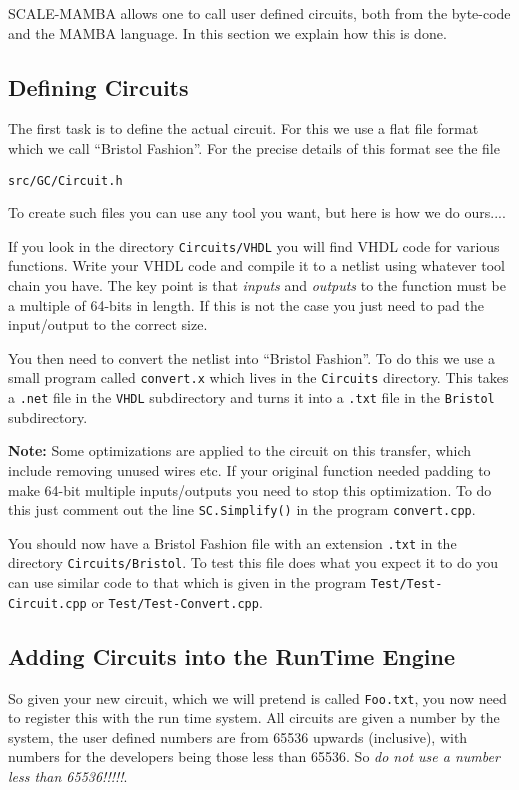 \label{sec:GC}
SCALE-MAMBA allows one to call user defined circuits, both
from the byte-code and the MAMBA language.
In this section we explain how this is done.

\subsection{Defining Circuits}
The first task is to define the actual circuit.
For this we use a flat file format which we call 
``Bristol Fashion''.
For the precise details of this format see the
file 
\begin{center}
\verb|src/GC/Circuit.h|
\end{center}
To create such files you can use any tool you want,
but here is how we do ours....

If you look in the directory \verb|Circuits/VHDL| you
will find VHDL code for various functions. Write your
VHDL code and compile it to a netlist using whatever
tool chain you have.
The key point is that {\em inputs} and {\em outputs}
to the function must be a multiple of 64-bits in length.
If this is not the case you just need to pad the
input/output to the correct size.

You then need to convert the netlist into ``Bristol 
Fashion''. To do this we use a small program
called \verb|convert.x| which lives in the 
\verb|Circuits| directory. This takes a \verb|.net|
file in the \verb|VHDL| subdirectory and turns it
into a \verb|.txt| file in the \verb|Bristol| subdirectory.

{\bf Note:} Some optimizations are applied to the
circuit on this transfer, which include removing unused
wires etc. If your original function needed padding to
make 64-bit multiple inputs/outputs you need to stop
this optimization. To do this just comment out the
line \verb|SC.Simplify()| in the program \verb|convert.cpp|.

You should now have a Bristol Fashion file with an 
extension \verb|.txt| in the directory \verb|Circuits/Bristol|.
To test this file does what you expect it to do you
can use similar code to that which is given in the
program \verb|Test/Test-Circuit.cpp| or
\verb|Test/Test-Convert.cpp|.

\subsection{Adding Circuits into the RunTime Engine}
So given your new circuit, which we will pretend is
called \verb|Foo.txt|, you now need to register this
with the run time system.
All circuits are given a number by the system,
the user defined numbers are from 65536 upwards (inclusive),
with numbers for the developers being those less
than 65536.
So {\em do not use a number less than 65536!!!!!}.

